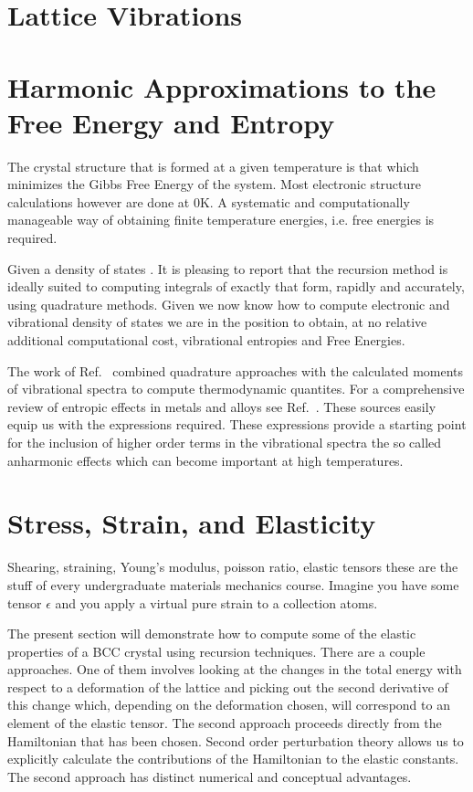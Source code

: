 \section{Lattice Vibrations}

\section{Harmonic Approximations to the Free Energy and Entropy}
The crystal structure that is formed at a given temperature is that which
minimizes the Gibbs Free Energy of the system. Most electronic structure calculations
however are done at 0K. A systematic and computationally manageable way of obtaining
finite temperature energies, i.e. free energies is required.

Given a density of states . It is pleasing to report that the recursion method
is ideally suited to computing integrals of exactly that form, rapidly and accurately,
using quadrature methods. Given we now know how to compute electronic and 
vibrational density of states we are in the position to obtain, at no relative additional 
computational cost, vibrational entropies and Free Energies.

The work of Ref.~\cite{wheeler68} combined quadrature approaches
with the calculated moments of vibrational spectra to compute
thermodynamic quantites. For a comprehensive review
of entropic effects in metals and alloys see Ref.~\cite{fultz10}. 
These sources easily equip us with the expressions required. These expressions provide a starting
point for the inclusion of higher order terms in the vibrational spectra
the so called anharmonic effects which can become important at high temperatures.

\section{Stress, Strain, and Elasticity}
Shearing, straining, Young's modulus, poisson ratio, elastic tensors these are the
stuff of every undergraduate materials mechanics course.
Imagine you have some tensor $\epsilon$ and you apply a virtual pure strain to a collection atoms.

The present section will demonstrate how to compute some of the elastic properties
of a BCC crystal using recursion techniques. There are a couple approaches.
One of them involves looking at the changes in the total energy with
respect to a deformation of the lattice and picking out the 
second derivative of this change which, depending on the deformation chosen,
will correspond to an element of the elastic tensor. The second approach
proceeds directly from the Hamiltonian that has been chosen. Second order
perturbation theory allows us to explicitly calculate the contributions of
the Hamiltonian to the elastic constants. The second approach has distinct
numerical and conceptual advantages.

